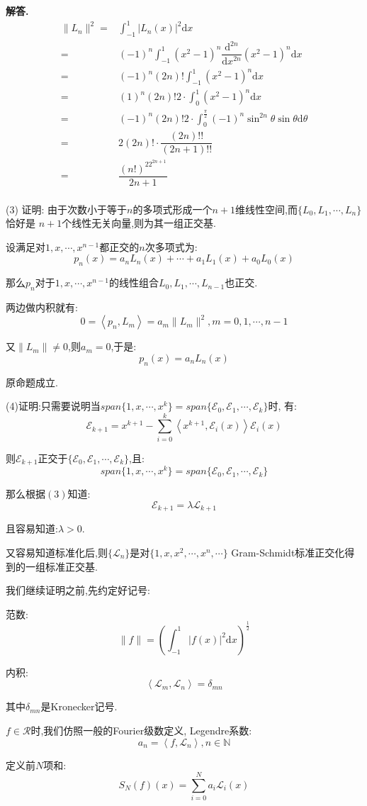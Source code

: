 \documentclass[12pt, a4paper, oneside]{ctexart}
\newenvironment{solution}{\par\noindent\textbf{解答. }}{\par}
\begin{document}
\begin{solution}
$$
\begin{aligned}
\|L_n\|^2
=&\int_{-1}^{1}|L_n(x)|^2\mathrm{d}x\\
=&(-1)^n\int_{-1}^{1}(x^2-1)^n\dfrac{\mathrm{d}^{2n}}{\mathrm{d}x^{2n}}(x^2-1)^n\mathrm{d}x\\
=&(-1)^n(2n)!\int_{-1}^{1}(x^2-1)^n\mathrm{d}x\\
=&(1)^n(2n)!2\cdot\int_{0}^{1}(x^2-1)^n\mathrm{d}x\\
=&(-1)^n(2n)!2\cdot\int_{0}^{\frac{\pi}{2}}(-1)^n\sin^{2n}\theta \sin \theta \mathrm{d}\theta\\
=&2(2n)!\cdot \dfrac{(2n)!!}{(2n+1)!!}\\
=&\dfrac{(n!)^22^{2n+1}}{2n+1}\\
\end{aligned}
$$
\par
(3)
证明:
由于次数小于等于$n$的多项式形成一个$n+1$维线性空间,而$\{L_0,L_1,\cdots,L_n\}$恰好是
$n+1$个线性无关向量,则为其一组正交基.
\par
设满足对$1,x,\cdots,x^{n-1}$都正交的$n$次多项式为:
$$
p_n(x)=a_nL_n(x)+\cdots+a_1L_1(x)+a_0L_0(x)
$$
\par
那么$p_n$对于$1,x,\cdots,x^{n-1}$的线性组合$L_0,L_1,\cdots,L_{n-1}$也正交.
\par
两边做内积就有:
$$
0=\left \langle p_n, L_m\right \rangle=a_m\|L_m\|^2, m=0,1,\cdots,n-1
$$
\par
又$\|L_m\|\ne 0$,则$a_m=0$,于是:
$$
p_n(x)=a_nL_n(x)
$$
\par
原命题成立.
\par
(4)证明:只需要说明当$span\{1,x,\cdots,x^k\}=span\{\mathcal{E}_0,\mathcal{E}_1,\cdots,\mathcal{E}_k\}$时,
有:$$
\mathcal{E}_{k+1}=x^{k+1}-\sum_{i=0}^{k}\left \langle x^{k+1}, \mathcal{E}_i(x)\right \rangle\mathcal{E}_i(x)
$$
\par
则$\mathcal{E}_{k+1}$正交于$\{\mathcal{E}_0,\mathcal{E}_1,\cdots,\mathcal{E}_k\}$,且:
$$
span\{1,x,\cdots,x^k\}=span\{\mathcal{E}_0,\mathcal{E}_1,\cdots,\mathcal{E}_k\}
$$
\par
那么根据$(3)$知道:
$$
\mathcal{E}_{k+1}=\lambda \mathcal{L}_{k+1}
$$
\par
且容易知道:$\lambda>0$.
\par
又容易知道标准化后,则$\{\mathcal{L}_n\}$是对$\{1,x,x^2,\cdots,x^n,\cdots\}$
Gram-Schmidt标准正交化得到的一组标准正交基.
\par
我们继续证明之前,先约定好记号:
\par
范数:
$$
\|f\|=\left(\int_{-1}^{1}|f(x)|^2\mathrm{d}x\right)^{\frac{1}{2}}
$$
\par
内积:
$$
\left \langle \mathcal{L}_m,\mathcal{L}_n \right \rangle=\delta_{mn}
$$
\par
其中$\delta_{mn}$是Kronecker记号.
\par
$f\in \mathcal{R}$时,我们仿照一般的Fourier级数定义,
Legendre系数:
$$
a_n=\left \langle f, \mathcal{L}_n \right \rangle, n \in \mathbb{N}
$$
\par
定义前$N$项和:
$$
S_N(f)(x)=\sum_{i=0}^{N}a_i\mathcal{L}_i(x)
$$


\end{solution}
\end{document}
